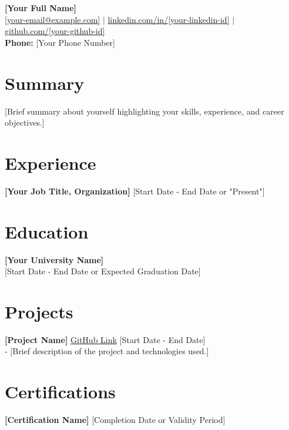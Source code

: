 \documentclass[10pt,letterpaper]{article}
\begin{document}
\noindent
{\LARGE \textbf{[Your Full Name]}} \\
\href{mailto:[your-email@example.com]}{[your-email@example.com]} $\vert$ \href{https://www.linkedin.com/in/[your-linkedin-id]}{linkedin.com/in/[your-linkedin-id]} $\vert$ \href{https://github.com/[your-github-id]}{github.com/[your-github-id]} \\
\textbf{Phone:} [Your Phone Number]

\section*{Summary}
[Brief summary about yourself highlighting your skills, experience, and career objectives.]

\section*{Experience}
\textbf{[Your Job Title, Organization]} \hfill [Start Date - End Date or "Present"] \\ 
[Brief description of your responsibilities and achievements.]

\section*{Education}
\textbf{[Your University Name]} \\
[Degree and Major] \hfill [Start Date - End Date or Expected Graduation Date] \\
[Additional details like certifications or distinctions.]

\section*{Projects}
\vspace{0.2cm}
\textbf{[Project Name]} \href{[Project Link]}{GitHub Link} \hfill [Start Date - End Date] \\
- [Brief description of the project and technologies used.]

\vspace{0.2cm}

\section*{Certifications}
\textbf{[Certification Name]} \hfill [Completion Date or Validity Period] \\
[Include links if applicable.]
\end{document}
